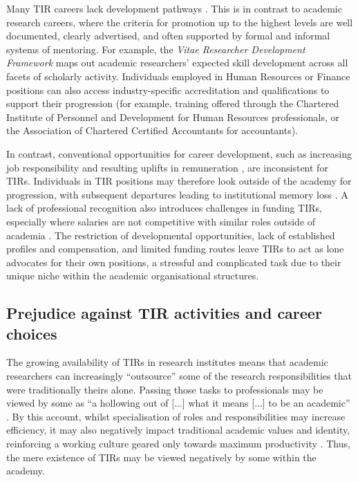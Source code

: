 \documentclass[authordate,meta,issue]{jote-new-article}
\begin{document}
Many TIR careers lack development pathways \parencites{NCRIS2022}{Virágh2019}. This is in contrast to academic research careers, where the criteria for promotion up to the highest levels are well documented, clearly advertised, and often supported by formal and informal systems of mentoring. For example, the \emph{Vitae Researcher Development Framework} \parencites{Vitae2014} maps out academic researchers' expected skill development across all facets of scholarly activity. Individuals employed in Human Resources or Finance positions can also access industry-specific accreditation and qualifications to support their progression (for example, training offered through the Chartered Institute of Personnel and Development for Human Resources professionals, or the Association of Chartered Certified Accountants for accountants).







In contrast, conventional opportunities for career development, such as increasing job responsibility and resulting uplifts in remuneration \parencites{UKRI-ResearchEngland2022}{Virágh2019}, are inconsistent for TIRs. Individuals in TIR positions may therefore look outside of the academy for progression, with subsequent departures leading to institutional memory loss \parencites{Bossu2018}{McInturff2022}. A lack of professional recognition also introduces challenges in funding TIRs, especially where salaries are not competitive with similar roles outside of academia \parencites{UKRI-ResearchEngland2022}. The restriction of developmental opportunities, lack of established profiles and compensation, and limited funding routes leave TIRs to act as lone advocates for their own positions, a stressful and complicated task due to their unique niche within the academic organisational structures.



\subsection{Prejudice against TIR activities and career choices}



The growing availability of TIRs in research institutes means that academic researchers can increasingly “outsource” some of the research responsibilities that were traditionally theirs alone. Passing those tasks to professionals may be viewed by some as “a hollowing out of [...] what it means [...] to be an academic” \parencites[71]{Macfarlane2011}. By this account, whilst specialisation of roles and responsibilities may increase efficiency, it may also negatively impact traditional academic values and identity, reinforcing a working culture geared only towards maximum productivity \parencites{Beatson2021}{Limas2022}{WellcomeTrust2020}. Thus, the mere existence of TIRs may be viewed negatively by some within the academy.
\end{document}
